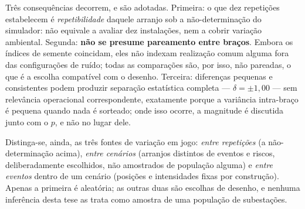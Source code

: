 Três consequências decorrem, e são adotadas. Primeira: o que dez repetições
estabelecem é \emph{repetibilidade} daquele arranjo sob a não-determinação do
simulador: não equivale a avaliar dez instalações, nem a cobrir variação ambiental.
Segunda: \textbf{não se presume pareamento entre braços}. Embora os índices de semente
coincidam, eles não indexam realização comum alguma fora das configurações de ruído;
todas as comparações são, por isso, não pareadas, o que é a escolha compatível com o
desenho. Terceira: diferenças pequenas e consistentes podem produzir separação
estatística completa --- $\delta=\pm1{,}00$ --- sem relevância operacional
correspondente, exatamente porque a variância intra-braço é pequena quando nada é
sorteado; onde isso ocorre, a magnitude é discutida junto com o $p$, e não no lugar
dele.

Distinga-se, ainda, as três fontes de variação em jogo: \emph{entre repetições} (a
não-determinação acima), \emph{entre cenários} (arranjos distintos de eventos e
riscos, deliberadamente escolhidos, não amostrados de população alguma) e \emph{entre
eventos} dentro de um cenário (posições e intensidades fixas por construção). Apenas a
primeira é aleatória; as outras duas são escolhas de desenho, e nenhuma inferência
desta tese as trata como amostra de uma população de subestações.
